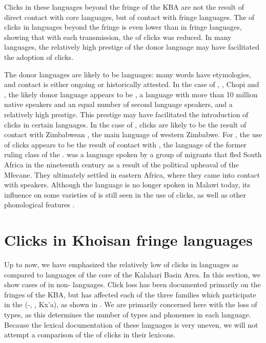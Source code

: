 \documentclass[output=paper,newtxmath,modfonts,nonflat,draftmode]{langsci/langscibook}
\begin{document}
Clicks in these  languages beyond the fringe of the KBA are not the result of direct contact with core languages, but of contact with fringe languages. The  of clicks in  languages beyond the fringe is even lower than in fringe languages, showing that with each transmission, the  of clicks was reduced. In many languages, the relatively high prestige of the donor language may have facilitated the adoption of clicks. 

The donor languages are likely to be  languages: many  words have  etymologies, and contact is either ongoing or historically attested. In the case of , , Chopi and , the likely donor language appears to be , a language with more than 10 million native speakers and an equal number of second language speakers, and a relatively high prestige. This prestige may have facilitated the introduction of clicks in certain languages. In the case of , clicks are likely to be the result of contact with Zimbabwean , the main language of western Zimbabwe. For , the use of clicks appears to be the result of contact with , the language of the former ruling class of the .  was a  language spoken by a group of migrants that fled South Africa in the nineteenth century as a result of the political upheaval of the Mfecane. They ultimately settled in eastern Africa, where they came into contact with  speakers. Although the  language is no longer spoken in Malawi today, its influence on some varieties of  is still seen in the use of clicks, as well as other phonological features \citep{Moyo1995}. 

\section{Clicks in Khoisan fringe languages}\label{sec:sands:5}

Up to now, we have emphasized the relatively low  of clicks in  languages as compared to languages of the core of the Kalahari Basin Area. In this section, we show cases of  in non- languages. Click loss has been documented primarily on the fringes of the KBA, but has affected each of the three families which participate in the  (-, , Kx'a), as shown in . We are primarily concerned here with the loss of  types, as this determines the number of  types and  phonemes in each language. Because the lexical documentation of these languages is very uneven, we will not attempt a comparison of the  of clicks in their lexicons. 
\end{document}
